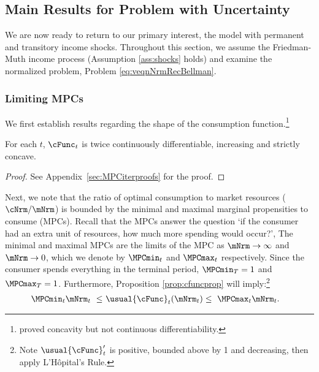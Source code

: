 \documentclass[BufferStockTheory]{subfiles}
\begin{document}
\hypertarget{limsolexists}{}
\subsection{Main Results for Problem with Uncertainty}\label{subsec:limSolExists}

We are now ready to return to our primary interest, the model with permanent and transitory income shocks.
Throughout this section, we assume the Friedman-Muth income process (Assumption \ref{ass:shocks} holds) and examine the normalized problem, Problem \ref{eq:veqnNrmRecBellman}.



\subsubsection{Limiting MPCs}\label{subsubsec:cFuncBounds}

We first establish results regarding the shape of the consumption function.\footnote{\cite{ckConcavity} proved concavity but not continuous differentiability.}

\begin{proposition} \label{prop:cfuncprop} For each $t$, $\cFunc_{t}$ is twice continuously differentiable, increasing and strictly concave.
\end{proposition}
\begin{proof}\let\qed\relax
See Appendix~\ref{sec:MPCiterproofs} for the proof.

\end{proof}

Next, we note that the ratio of optimal consumption to market resources ($\cNrm/\mNrm$) is bounded by the minimal and maximal marginal propensities to consume (MPCs).
Recall that the MPCs answer the question `if the consumer had an extra unit of resources, how much more spending would occur?', The minimal and maximal MPCs are the limits of the MPC as $\mNrm \rightarrow \infty$ and $\mNrm \rightarrow 0$, which we denote by $\MPCmin_{t}$ and $\MPCmax_{t}$ respectively.
Since the consumer spends everything in the terminal period, $\MPCmin_{T}=1$ and $\MPCmax_{T}=1$.
Furthermore, Proposition \ref{prop:cfuncprop} will imply:\footnote{Note $\usual{\cFunc}_{t}^{\prime}$ is positive, bounded above by 1 and decreasing, then apply L'H\^{o}pital's Rule.}
%
\begin{align}\label{eq:cBounds}
  \MPCmin_{t} \mNrm_{t} ~ \leq & ~  \usual{\cFunc}_{t}(\mNrm_{t})  \leq  ~ \MPCmax_{t} \mNrm_{t} .
\end{align} 
\end{document}
